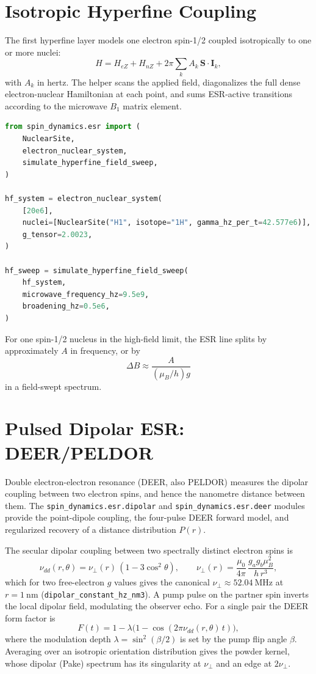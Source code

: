\documentclass[11pt,oneside]{report}
\newcommand{\code}[1]{\texttt{#1}}
\begin{document}
\section{Isotropic Hyperfine Coupling}

The first hyperfine layer models one electron spin-1/2 coupled isotropically to
one or more nuclei:
\[
  H =
    H_{eZ} + H_{nZ}
    + 2\pi\sum_k A_k\,\mathbf{S}\cdot\mathbf{I}_k ,
\]
with \(A_k\) in hertz. The helper scans the applied field, diagonalizes the
full dense electron-nuclear Hamiltonian at each point, and sums ESR-active
transitions according to the microwave \(B_1\) matrix element.

\begin{lstlisting}[language=Python]
from spin_dynamics.esr import (
    NuclearSite,
    electron_nuclear_system,
    simulate_hyperfine_field_sweep,
)

hf_system = electron_nuclear_system(
    [20e6],
    nuclei=[NuclearSite("H1", isotope="1H", gamma_hz_per_t=42.577e6)],
    g_tensor=2.0023,
)

hf_sweep = simulate_hyperfine_field_sweep(
    hf_system,
    microwave_frequency_hz=9.5e9,
    broadening_hz=0.5e6,
)
\end{lstlisting}

For one spin-1/2 nucleus in the high-field limit, the ESR line splits by
approximately \(A\) in frequency, or by
\[
  \Delta B \approx \frac{A}{(\mu_B/h)g}
\]
in a field-swept spectrum.

\section{Pulsed Dipolar ESR: DEER/PELDOR}
\label{sec:deer}

Double electron-electron resonance (DEER, also PELDOR) measures the dipolar
coupling between two electron spins, and hence the nanometre distance between
them. The \code{spin\_dynamics.esr.dipolar} and \code{spin\_dynamics.esr.deer}
modules provide the point-dipole coupling, the four-pulse DEER forward model,
and regularized recovery of a distance distribution \(P(r)\).

The secular dipolar coupling between two spectrally distinct electron spins is
\[
  \nu_{dd}(r,\theta) = \nu_\perp(r)\,(1 - 3\cos^2\theta),
  \qquad
  \nu_\perp(r) = \frac{\mu_0}{4\pi}\,\frac{g_a g_b \mu_B^2}{h\,r^3},
\]
which for two free-electron \(g\) values gives the canonical
\(\nu_\perp \approx 52.04~\mathrm{MHz}\) at \(r = 1~\mathrm{nm}\)
(\code{dipolar\_constant\_hz\_nm3}). A pump pulse on the partner spin inverts the
local dipolar field, modulating the observer echo. For a single pair the DEER
form factor is
\[
  F(t) = 1 - \lambda\bigl(1 - \cos(2\pi\nu_{dd}(r,\theta)\,t)\bigr),
\]
where the modulation depth \(\lambda = \sin^2(\beta/2)\) is set by the pump flip
angle \(\beta\). Averaging over an isotropic orientation distribution gives the
powder kernel, whose dipolar (Pake) spectrum has its singularity at
\(\nu_\perp\) and an edge at \(2\nu_\perp\).
\end{document}
